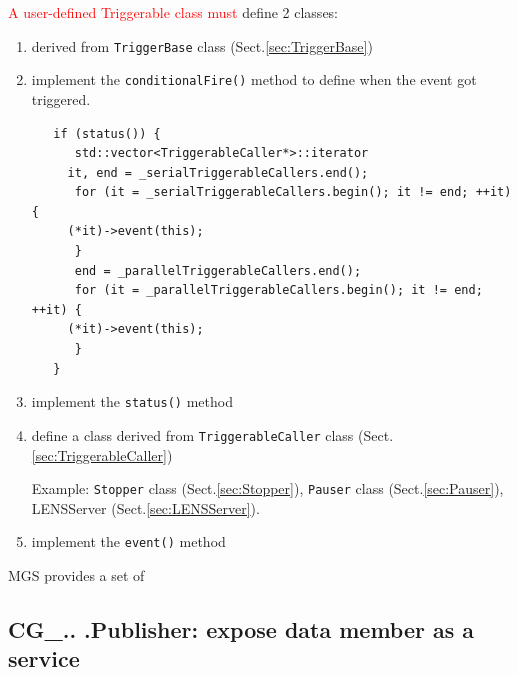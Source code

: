 \textcolor{red}{A user-defined Triggerable class must} define 2 classes:
\begin{enumerate}
  \item derived from \verb!TriggerBase! class (Sect.\ref{sec:TriggerBase})

  \item implement the \verb!conditionalFire()! method to define when the event
  got triggered.

\begin{verbatim}
   if (status()) {
      std::vector<TriggerableCaller*>::iterator 
	 it, end = _serialTriggerableCallers.end();
      for (it = _serialTriggerableCallers.begin(); it != end; ++it) {
	 (*it)->event(this);
      }
      end = _parallelTriggerableCallers.end();
      for (it = _parallelTriggerableCallers.begin(); it != end; ++it) {
	 (*it)->event(this);
      }
   }
\end{verbatim}  

  \item implement the \verb!status()! method 
  
  \item define a class derived from \verb!TriggerableCaller! class
  (Sect.\ref{sec:TriggerableCaller})

Example: \verb!Stopper! class (Sect.\ref{sec:Stopper}), \verb!Pauser! class
(Sect.\ref{sec:Pauser}), LENSServer (Sect.\ref{sec:LENSServer}).

 
  \item implement the \verb!event()! method
\end{enumerate}


MGS provides a set of 

\subsection{CG\_.. .Publisher: expose data member as a service}
\label{sec:CG_xxxPublisher}

